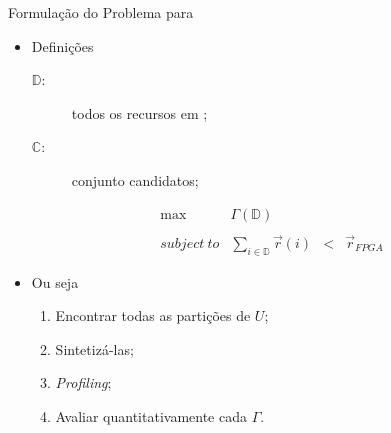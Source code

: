       \begin{frame}{Formulação do Problema para \Wearables}
         \begin{itemize}
            \item Definições
            \begin{description}
               \item [$ \mathbb{D} $:] todos os recursos em \hardware;
               \item [$ \mathbb{C} $:] conjunto candidatos;
            \end{description}
         
            \begin{equation}
            \begin{array}{rrcl}
            \text{max}                 & \Gamma ( \mathbb{D})               & ~   & ~                \\
            & & & \\
            subject\ to & \sum_{i \in \mathbb{D}} \vec{r}(i) & < & \vec{r}_{FPGA}
            \end{array}
            \label{eq:constraints}
            \end{equation}
            
               \bigskip
            
            \item Ou seja
      
            \begin{enumerate} \setlength{\itemsep}{0.6em}
               \item Encontrar todas as partições de $ U $;
               \item Sintetizá-las;
               \item \textit{Profiling};
               \item Avaliar quantitativamente cada $ \Gamma $.
            \end{enumerate}
         \end{itemize}
      \end{frame}
   

